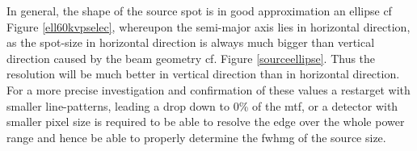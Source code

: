 In general, the shape of the source spot is in good approximation an ellipse cf Figure \ref{ell60kvpselec}, whereupon the semi-major axis lies in horizontal direction, as the spot-size in horizontal direction is always much bigger than vertical direction caused by the beam geometry cf. Figure \ref{sourceellipse}. Thus the resolution will be much better in vertical direction than in horizontal direction. For a more precise investigation and confirmation of these values a \gls{restarget} with smaller line-patterns, leading a drop down to 0\% of the \gls{mtf}, or a detector with smaller pixel size is required to be able to resolve the edge over the whole power range and hence be able to properly determine the \gls{fwhmg} of the source size. 
